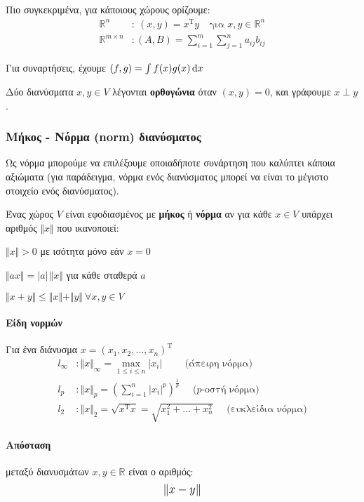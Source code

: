 \documentclass[11pt,a4paper,notitlepage,fleqn,draft]{article}
\begin{document}
	Πιο συγκεκριμένα, για κάποιους χώρους ορίζουμε:
	\begin{align*}
	\mathbb R^n &: \ (x,y) = x^{\mathrm T}y \quad
	\text{για } x,y \in \mathbb R^n
	\\
	\mathbb R^{m\times n} &: (A,B) =
	\sum_{i=1}^{m}\sum_{j=1}^{n} a_{ij}b_{ij}
	\end{align*}
	
	Για συναρτήσεις, έχουμε \( (f,g) = \int f(x)g(x)\mathop{}\!\mathrm{d} x \)
	
	Δύο διανύσματα \( x,y \in V \) λέγονται \textbf{ορθογώνια} όταν
	\( (x,y) = 0\), και γράφουμε \( x \perp y \).
	
	\subsubsection{Μήκος - Νόρμα (norm) διανύσματος}
	Ως νόρμα μπορούμε να επιλέξουμε οποιαδήποτε συνάρτηση που καλύπτει
	κάποια αξιώματα (για παράδειγμα, νόρμα ενός διανύσματος μπορεί να
	είναι το μέγιστο στοιχείο ενός διανύσματος).
	
	Ένας χώρος \( V \) είναι εφοδιασμένος με \textbf{μήκος} ή
	\textbf{νόρμα} αν για κάθε \( x \in V \) υπάρχει αριθμός
	\( \Vert x\Vert \) που ικανοποιεί:
	
	\begin{enumroman}
		\item \( \Vert x\Vert > 0 \) με ισότητα μόνο εάν \( x=0 \)
		\item \( \Vert ax\Vert = |a|\,\Vert x\Vert \) για κάθε σταθερά \( a \)
		\item \( \Vert x+y\Vert \leq \Vert x\Vert+\Vert y\Vert \ \forall x,y\in V  \)
	\end{enumroman}
	
	\paragraph{Είδη νορμών}
	Για ένα διάνυσμα \( x=(x_1,x_2,\dots,x_n)^{\mathrm T} \)
	\begin{align*}
		l_{\infty} &: \Vert x\Vert _{\infty} = \max_{1\leq i \leq n}|x_i|
		\qquad \text{ (άπειρη νόρμα)}
		\\
		l_p &: \Vert x\Vert _{p} =
		\left(\sum_{i=1}^n |x_i|^p\right)^{\frac{1}{p}}
		\quad \text{ ($p$-οστή νόρμα)}
		\\
		l_2 &: \Vert x\Vert _2 = \sqrt{x^{\mathrm T}x} =
		\sqrt{x_1^2 + \dots + x_n^2}
		\quad \text{ (ευκλείδια νόρμα)}
	\end{align*}
	
	\paragraph{Απόσταση}
	μεταξύ διανυσμάτων \( x,y \in \mathbb R  \) είναι ο αριθμός:
	\[
    \mathlarger{\Vert x-y\Vert }
	\]
	
\end{document}
